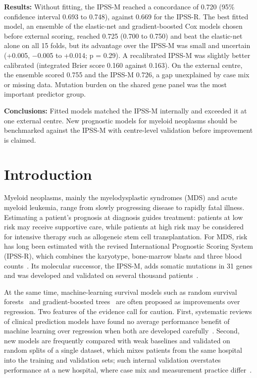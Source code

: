 \documentclass[10pt,letterpaper]{article}
\begin{document}
\textbf{Results:} Without fitting, the IPSS-M reached a concordance of 0.720 (95\%
confidence interval 0.693 to 0.748), against 0.669 for the IPSS-R. The best fitted model,
an ensemble of the elastic-net and gradient-boosted Cox models chosen before external
scoring, reached 0.725 (0.700 to 0.750) and beat the elastic-net alone on all 15 folds,
but its advantage over the IPSS-M was small and uncertain (+0.005, $-$0.005 to +0.014;
p = 0.29). A recalibrated IPSS-M was slightly better calibrated (integrated Brier score
0.160 against 0.163). On the external centre, the ensemble scored 0.755 and the IPSS-M
0.726, a gap unexplained by case mix or missing data. Mutation burden on the shared gene panel was the most important
predictor group.

\textbf{Conclusions:} Fitted models matched the IPSS-M internally and exceeded it at one
external centre. New prognostic models for myeloid neoplasms should be benchmarked
against the IPSS-M with centre-level validation before improvement is claimed.


\linenumbers

\section*{Introduction}
Myeloid neoplasms, mainly the myelodysplastic syndromes (MDS) and acute myeloid leukemia,
range from slowly progressing disease to rapidly fatal illness. Estimating a patient's
prognosis at diagnosis guides treatment: patients at low risk may receive supportive care,
while patients at high risk may be considered for intensive therapy such as allogeneic
stem cell transplantation. For MDS, risk has long been estimated with the revised
International Prognostic Scoring System (IPSS-R), which combines the karyotype, bone-marrow
blasts and three blood counts~\cite{greenberg2012,schanz2012}. Its molecular successor, the
IPSS-M, adds somatic mutations in 31 genes and was developed and validated on several
thousand patients~\cite{bernard2022}.

At the same time, machine-learning survival models such as random survival
forests~\cite{ishwaran2008} and gradient-boosted trees~\cite{friedman2001,chen2016} are
often proposed as improvements over regression. Two features of the evidence call for
caution. First, systematic reviews of clinical prediction models have found no average
performance benefit of machine learning over regression when both are developed
carefully~\cite{christodoulou2019}. Second, new models are frequently compared with weak
baselines and validated on random splits of a single dataset, which mixes patients from
the same hospital into the training and validation sets; such internal validation
overstates performance at a new hospital, where case mix and measurement practice
differ~\cite{austin2016,steyerberg2019}.
\end{document}
